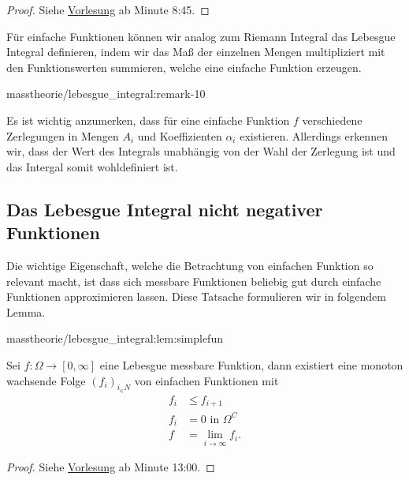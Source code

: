 \begin{proof}
 Siehe \href{https://www.fau.tv/clip/id/40589}{Vorlesung} ab Minute 8:45.
\end{proof}

\par
Für einfache Funktionen können wir analog zum Riemann Integral das Lebesgue Integral definieren, indem wir das Maß der einzelnen Mengen multipliziert mit den Funktionswerten summieren, welche eine einfache Funktion erzeugen.
\begin{remark}{}{masstheorie/lebesgue_integral:remark-10}



\par
Es ist wichtig anzumerken, dass für eine einfache Funktion \(f\) verschiedene Zerlegungen in Mengen \(A_i\) und Koeffizienten \(\alpha_i\) existieren. Allerdings erkennen wir, dass der Wert des Integrals unabhängig von der Wahl der Zerlegung ist und das Intergal somit wohldefiniert ist.
\end{remark}


\subsection{Das Lebesgue Integral nicht negativer Funktionen}
\label{\detokenize{masstheorie/lebesgue_integral:das-lebesgue-integral-nicht-negativer-funktionen}}
\par
Die wichtige Eigenschaft, welche die Betrachtung von einfachen Funktion so relevant macht, ist dass sich messbare Funktionen beliebig gut durch einfache Funktionen approximieren lassen. Diese Tatsache formulieren wir in folgendem Lemma.
\begin{lemma}{}{masstheorie/lebesgue_integral:lem:simplefun}



\par
Sei \(f \colon \Omega \to [0,\infty]\) eine Lebesgue messbare Funktion, dann existiert eine monoton wachsende Folge \((f_i)_{i_\in N}\) von einfachen Funktionen mit
\begin{align*}
f_i&\leq f_{i+1}\\
f_i &= 0\text{ in }\Omega^C\\
f&=\lim_{i\to\infty} f_i.
\end{align*}\end{lemma}

\begin{proof}
 Siehe \href{https://www.fau.tv/clip/id/40589}{Vorlesung} ab Minute 13:00.
\end{proof}

